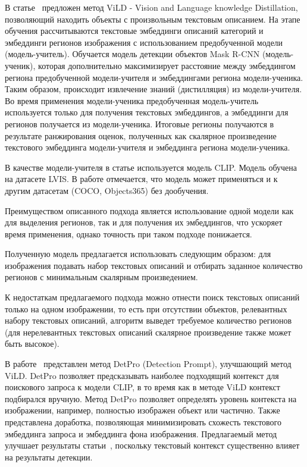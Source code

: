 \documentclass[a4paper,14pt]{article}
\begin{document}
    В статье~\cite{ViLD} предложен метод ViLD - Vision and Language knowledge Distillation, позволяющий находить объекты с произвольным текстовым описанием.
    На этапе обучения рассчитываются текстовые эмбеддинги описаний категорий и эмбеддинги регионов изображения с использованием предобученной модели (модель-учитель).
    Обучается модель детекции объектов Mask R-CNN (модель-ученик), которая дополнительно максимизирует расстояние между эмбеддингом региона предобученной модели-учителя и эмбеддингами региона модели-ученика.
    Таким образом, происходит извлечение знаний (дистилляция) из модели-учителя.
    Во время применения модели-ученика предобученная модель-учитель используется только для получения текстовых эмбеддингов, а эмбеддинги для регионов получается из модели-ученика.
    Итоговые регионы получаются в результате ранжирования оценок, полученных как скалярное произведение текстового эмбеддинга модели-учителя и эмбеддинга региона модели-ученика.

    В качестве модели-учителя в статье используется модель CLIP.
    Модель обучена на датасете LVIS.
    В работе отмечается, что модель может применяться и к другим датасетам (COCO, Objects365) без дообучения.

    Преимуществом описанного подхода является использование одной модели как для выделения регионов, так и для получения их эмбеддингов, что ускоряет время применения, однако точность при таком подходе понижается.

    Полученную модель предлагается использовать следующим образом: для изображения подавать набор текстовых описаний и отбирать заданное количество регионов с минимальным скалярным произведением.

    К недостаткам предлагаемого подхода можно отнести поиск текстовых описаний только на одном изображении, то есть при отсутствии объектов, релевантных набору текстовых описаний, алгоритм выведет требуемое количество регионов (для нерелевантных текстовых описаний скалярное произведение также может быть высокое).

    В работе~\cite{detpro} представлен метод DetPro (Detection Prompt), улучшающий метод ViLD.
    DetPro позволяет предсказывать наиболее подходящий контекст для поискового запроса к модели CLIP, в то время как в методе ViLD контекст подбирался вручную.
    Метод DetPro позволяет определять уровень контекста на изображении, например, полностью изображен объект или частично.
    Также представлена доработка, позволяющая минимизировать схожесть текстового эмбеддинга запроса и эмбеддинга фона изображения.
    Предлагаемый метод улучшает результаты статьи~\cite{ViLD}, поскольку текстовый контекст существенно влияет на результаты детекции.
\end{document}
